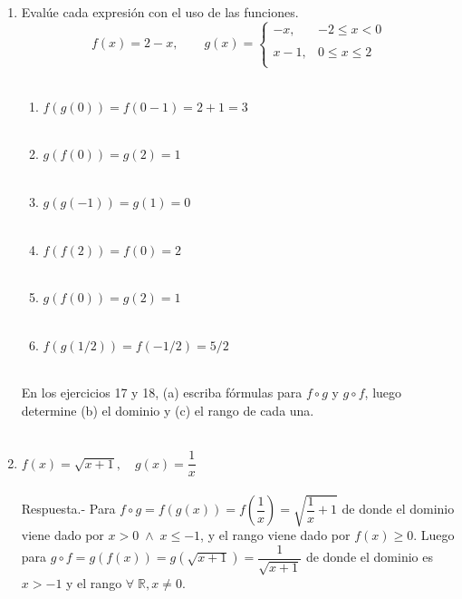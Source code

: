 \begin{enumerate}
\begin{enumerate}[\bfseries a.]
\end{enumerate}

\item Evalúe cada expresión con el uso de las funciones.
$$f(x) = 2-x, \qquad g(x) = \left\{\begin{array}{lr} -x,& -2\leq x < 0\\ \\x-1, & 0\leq x \leq 2\\ \end{array}\right.$$\\
\begin{enumerate}[\bfseries a.]
    
    \item $f(g(0)) = f(0-1) = 2 + 1 = 3$\\\\
    
    \item $g(f(0)) = g(2) = 1$\\\\
    
    \item $g(g(-1)) = g(1) = 0$\\\\
    
    \item $f(f(2)) = f(0) = 2$\\\\
    
    \item $g(f(0)) = g(2) = 1$\\\\
    
    \item $f(g(1/2)) = f(-1/2) = 5/2$\\\\
\end{enumerate}

En los ejercicios 17 y 18, (a) escriba fórmulas para $f\circ g$ y $g\circ f$, luego determine (b) el dominio y (c) el rango de cada una.\\\\

\item $f(x) =\sqrt{x+1}, \quad g(x)=\dfrac{1}{x}$\\\\
    Respuesta.-\; 
    Para $f\circ g = f(g(x)) = f\left(\dfrac{1}{x}\right) = \sqrt{\dfrac{1}{x}+1}$ de donde el dominio viene dado por $x>0 \; \land \; x\leq -1$, y el rango viene dado por $f(x)\geq 0$. Luego para $g\circ f = g(f(x)) = g(\sqrt{x+1}) = \dfrac{1}{\sqrt{x+1}}$ de donde el dominio es $x>-1$ y el rango $\forall \; \mathbb{R}, x\neq 0$.\\\\ 


\end{enumerate}

